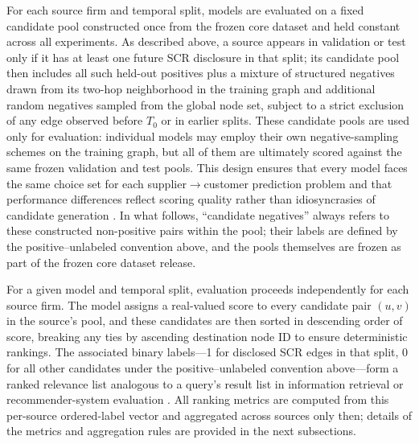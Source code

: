 For each source firm and temporal split, models are evaluated on a fixed candidate pool constructed once from the frozen core dataset and held constant across all experiments. As described above, a source appears in validation or test only if it has at least one future SCR disclosure in that split; its candidate pool then includes all such held-out positives plus a mixture of structured negatives drawn from its two-hop neighborhood in the training graph and additional random negatives sampled from the global node set, subject to a strict exclusion of any edge observed before $T_0$ or in earlier splits. These candidate pools are used only for evaluation: individual models may employ their own negative-sampling schemes on the training graph, but all of them are ultimately scored against the same frozen validation and test pools. This design ensures that every model faces the same choice set for each supplier$\to$customer prediction problem and that performance differences reflect scoring quality rather than idiosyncrasies of candidate generation \parencite{herlocker_evaluating_2004,shani_evaluating_2011}. In what follows, ``candidate negatives'' always refers to these constructed non-positive pairs within the pool; their labels are defined by the positive--unlabeled convention above, and the pools themselves are frozen as part of the frozen core dataset release.

For a given model and temporal split, evaluation proceeds independently for each source firm. The model assigns a real-valued score to every candidate pair $(u,v)$ in the source's pool, and these candidates are then sorted in descending order of score, breaking any ties by ascending destination node ID to ensure deterministic rankings. The associated binary labels---1 for disclosed SCR edges in that split, 0 for all other candidates under the positive--unlabeled convention above---form a ranked relevance list analogous to a query's result list in information retrieval or recommender-system evaluation \parencite{manning_introduction_2008,herlocker_evaluating_2004,shani_evaluating_2011}. All ranking metrics are computed from this per-source ordered-label vector and aggregated across sources only then; details of the metrics and aggregation rules are provided in the next subsections.

